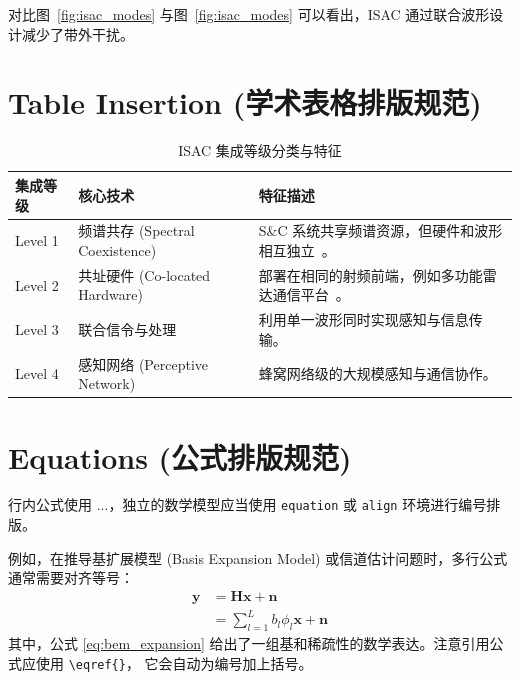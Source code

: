 对比图~\ref{fig:isac_modes} 与图~\ref{fig:isac_modes} 
可以看出，ISAC 通过联合波形设计减少了带外干扰。

\section{Table Insertion (学术表格排版规范)}

\begin{table}[htbp]
\centering
\caption{ISAC 集成等级分类与特征}
\label{tab:isac_levels}
\begin{tabular}{@{}llp{8cm}@{}} %
\toprule
集成等级 & 核心技术 & 特征描述 \\
\midrule
Level 1 & 频谱共存 (Spectral Coexistence) & S\&C 系统共享频谱资源，但硬件和波形相互独立~\cite{liu2022integrated}。 \\
Level 2 & 共址硬件 (Co-located Hardware) & 部署在相同的射频前端，例如多功能雷达通信平台~\cite{liu2022integrated}。\\
Level 3 & 联合信令与处理 & 利用单一波形同时实现感知与信息传输。 \\
Level 4 & 感知网络 (Perceptive Network) & 蜂窝网络级的大规模感知与通信协作。 \\
\bottomrule
\end{tabular}
\end{table}

\section{Equations (公式排版规范)}

行内公式使用 $...$，独立的数学模型应当使用 \texttt{equation} 或 \texttt{align} 环境进行编号排版。

例如，在推导基扩展模型 (Basis Expansion Model) 或信道估计问题时，多行公式通常需要对齐等号：
\begin{align}
    \mathbf{y} &= \mathbf{H}\mathbf{x} + \mathbf{n} \label{eq:channel_model} \\
               &= \sum_{l=1}^{L} b_l \phi_l \mathbf{x} + \mathbf{n} \label{eq:bem_expansion}
\end{align}
其中，公式 \eqref{eq:bem_expansion} 给出了一组基和稀疏性的数学表达。注意引用公式应使用 \verb|\eqref{}|，
它会自动为编号加上括号。

